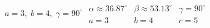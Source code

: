 { $a = 3, \; b = 4, \; \gamma = 90^{\circ}$}
{ $\begin{array}{lll}\alpha \approx 36.87^{\circ} & \beta \approx 53.13^{\circ} & \gamma = 90^{\circ} \\a = 3 & b = 4 & c = 5 \end{array}$}
